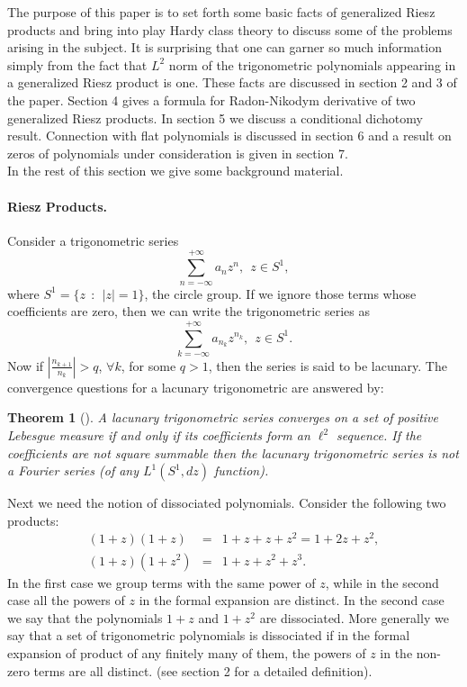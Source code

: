 \documentclass{amsart}
\newtheorem{Th}{Theorem}[section]
\theoremstyle{definition}
\theoremstyle{remark}
\numberwithin{equation}{section}
\newcommand{\1}{\mathbb{1}}
\begin{document}
 The purpose of this paper is to set forth some basic facts of generalized
 Riesz products and bring into play Hardy class theory to discuss some of the problems arising in the subject.
 It is surprising that one can garner so much information simply from the fact that $L^2$ norm of the trigonometric polynomials
 appearing in a generalized Riesz product is one. These facts are discussed in section 2 and 3 of the paper.
  Section 4 gives a formula for Radon-Nikodym derivative of two generalized Riesz products.
  In section 5 we discuss a conditional dichotomy result. Connection with flat polynomials is discussed in section 6 and
  a result on zeros of polynomials under consideration is given in section 7.\\

In the rest of this section we give some background material.\\

\paragraph{\textbf{Riesz Products.}} Consider a trigonometric series
$$\sum_{n=-\infty}^{+\infty}a_n z^n,~~z \in S^1,$$
where $S^1 = \{z ~~:~~ | z |= 1\}$, the circle group. If we ignore those terms whose coefficients are zero, then we can write the trigonometric series as
$$\sum_{k=-\infty}^{+\infty}a_{n_k}z^{n_k},~~z \in S^1.$$
Now if $|\frac{n_{k+1}}{n_k}|> q$, $\forall k$, for some $q > 1$, then the series is said to be lacunary. The
convergence questions for a lacunary trigonometric are answered by:
\begin{Th}[{\cite[p.203]{Zygmund}}]\label{thZ}
A lacunary trigonometric series converges on a set of positive Lebesgue measure if and only if its coefficients form an $\ell^2$ sequence. If the coefficients are not square summable then the lacunary trigonometric series is not a Fourier series (of any $L^1(S^1, dz)$ function).
\end{Th}
Next we need the notion of dissociated polynomials. Consider the following two products:
\begin{eqnarray*}
(1+z)(1+z) &=& 1+z+z +z^2 = 1 +2z +z^2,\\
(1+z)(1+z^2) &=& 1+z+z^2+z^3.
\end{eqnarray*}
In the first case we group terms with the same power of $z$, while in the second case all the powers of $z$ in the formal expansion are distinct. In the second case we say that the polynomials $1 + z$ and $1 + z^2$ are dissociated. More generally we say that a set of trigonometric polynomials is dissociated if in the formal expansion of product of any finitely many of them, the powers of $z$ in the non-zero terms are all distinct. (see section 2 for a detailed definition).\\
\end{document}
